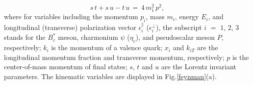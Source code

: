 \documentclass[preprint,superscriptaddress,nofootinbib]{revtex4}
\begin{document}
  \begin{equation}
  s\,t +s\,u-t\,u \,=\, 4\,m_{1}^{2}\,p^{2}
  \label{kine-pcm},
  \end{equation}
  where for variables including the momentum $p_{i}$,
  mass $m_{i}$, energy $E_{i}$, and longitudinal (transverse) polarization
  vector ${\epsilon}_{i}^{\parallel}$ (${\epsilon}_{i}^{\perp}$),
  the subscript $i$ $=$ $1$, $2$, $3$ stands for the $B_{c}^{\ast}$
  meson, charmonium ${\psi}$ (${\eta}_{c}$), and pseudoscalar meson $P$,
  respectively;
  $k_{i}$ is the momentum of a valence quark;
  $x_{i}$ and $k_{iT}$ are the longitudinal momentum fraction and
  transverse momentum, respectively;
  $p$ is the center-of-mass momentum of final states;
  $s$, $t$ and $u$ are the Lorentz invariant parameters.
  The kinematic variables are displayed in Fig.\ref{feynman}(a).

\end{document}
